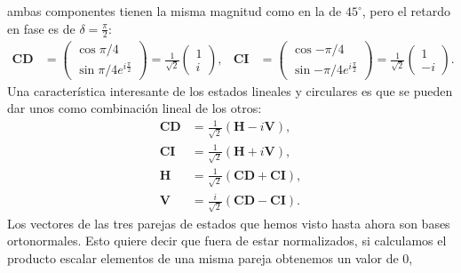 ambas componentes tienen la misma magnitud como en la de $45^{\circ}$,
pero el retardo en fase es de $\delta = \frac{\pi}{2}$:
\begin{align*}
\mathbf{CD}
&=\begin{pmatrix}\cos{\pi/4}\\\sin{\pi/4}e^{i\frac{\pi}{2}}\end{pmatrix}=\frac{1}{\sqrt{2}}
\begin{pmatrix}1\\i\end{pmatrix},&
\mathbf{CI} 
&=\begin{pmatrix}\cos{-\pi/4}\\\sin{-\pi/4}e^{i\frac{\pi}{2}}\end{pmatrix}=\frac{1}{\sqrt{2}}\begin{pmatrix}1\\-i\end{pmatrix}. 
\end{align*} 
Una característica interesante de los estados lineales y circulares es
que se pueden dar unos como combinación lineal de los otros:
\begin{align*}
\mathbf{CD} &= \frac{1}{\sqrt{2}}\left( \mathbf{H} -
  i\mathbf{V}\right),\\
\mathbf{CI} &= \frac{1}{\sqrt{2}}\left( \mathbf{H} +
  i\mathbf{V}\right),\\
\mathbf{H} &= \frac{1}{\sqrt{2}}\left( \mathbf{CD} +
  \mathbf{CI}\right),\\
\mathbf{V} &= \frac{i}{\sqrt{2}}\left( \mathbf{CD} -
  \mathbf{CI}\right).
\end{align*}
Los vectores de las tres parejas de estados que hemos visto hasta
ahora son bases
ortonormales. Esto quiere decir que fuera de estar normalizados,
si calculamos el producto escalar elementos de una misma pareja obtenemos un
valor de 0,

